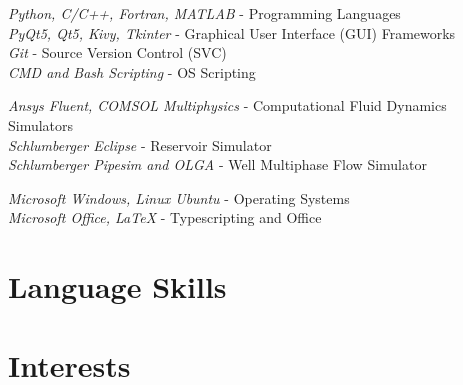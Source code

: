 \documentclass[10pt]{article} %
\begin{document}

{
\textit{Python, C/C++, Fortran, MATLAB} - Programming Languages\\
\textit{PyQt5, Qt5, Kivy, Tkinter} - Graphical User Interface (GUI) Frameworks\\
\textit{Git} - Source Version Control (SVC)\\
\textit{CMD and Bash Scripting} - OS Scripting
}


{
\textit{Ansys Fluent, COMSOL Multiphysics} - Computational Fluid Dynamics Simulators\\
\textit{Schlumberger Eclipse} - Reservoir Simulator\\
\textit{Schlumberger Pipesim and OLGA} - Well Multiphase Flow Simulator
}


{
\textit{Microsoft Windows, Linux Ubuntu} - Operating Systems\\
\textit{Microsoft Office, \LaTeX} - Typescripting and Office
}


\section{Language Skills}




\section{Interests}

\end{document}
